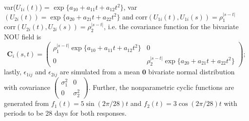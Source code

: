 \documentclass[article,lineno]{biometrika}
\begin{document}
var($U_{1i}(t)$) = $\exp\{a_{10} + a_{11}t + a_{12}t^2 \}$,
var
$
(U_{2i}(t)) = \exp\{a_{20} + a_{21}t + a_{22}t^2 \}
$
and 
corr$(U_{1i} (t), U_{1i}(s)) = \rho_1^{|s-t|}$
corr$(U_{2i} (t), U_{2i}(s)) = \rho_2^{|s-t|}$, i.e. the covariance function for the bivariate NOU field is 
\[
\boldsymbol C_i(s, t)
= 
\begin{pmatrix}
\rho_1^{|s-t|} \exp\{a_{10} + a_{11}t + a_{12}t^2 \} &  0  \\
0 & \rho_2^{|s-t|}\exp\{a_{20} + a_{21}t + a_{22}t^2 \}
\end{pmatrix};
\]
lastly, 
$\epsilon_{1ij}$ and $\epsilon_{2ij}$ are simulated from a mean $\bm 0$ bivariate normal distribution with covariance 
$\begin{pmatrix}
\sigma_1^2 & 0  \\
0 &   \sigma_2^2 
\end{pmatrix}$.
Further, the nonparametric cyclic functions are generated from 
$f_1 (t) = 5 \sin\left({2\pi / 28}\right)t$ and
$f_2 (t) = 3 \cos\left({2\pi / 28}\right)t$
with periods to be 28 days for both responses. 
\end{document}
